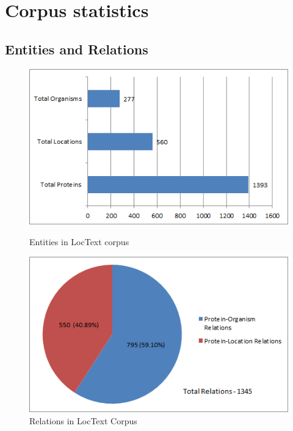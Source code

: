 \section{Corpus statistics}


\subsection*{Entities and Relations}

\begin{figure}
\centering
\begin{minipage}{.5\textwidth}
  \centering
  \includegraphics[width=.95\textwidth]{figures/ProtLocOrg_Distribution.png}
  \caption{Entities in LocText corpus}
  \label{fig:LocText_Entities}
\end{minipage}%
\begin{minipage}{.5\textwidth}
  \centering
  \includegraphics[width=.95\textwidth]{figures/AllRelationsPie.png}
  \caption{Relations in LocText Corpus}
  \label{fig:LocText_Relations}
\end{minipage}
\end{figure}


